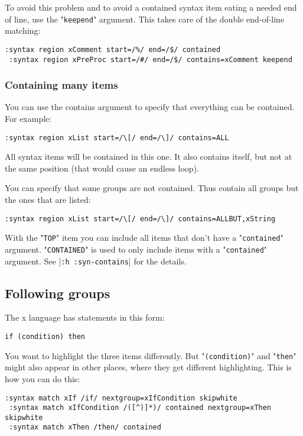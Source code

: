 To avoid this problem and to avoid a contained syntax item eating a needed end of line, use the "\verb!keepend!" argument.
This takes care of the double end-of-line matching:

\begin{Verbatim}[samepage=true]
 :syntax region xComment start=/%/ end=/$/ contained
 :syntax region xPreProc start=/#/ end=/$/ contains=xComment keepend
\end{Verbatim}

\subsubsection{Containing many items}
You can use the contains argument to specify that everything can be contained.
For example:

\begin{Verbatim}[samepage=true]
 :syntax region xList start=/\[/ end=/\]/ contains=ALL
\end{Verbatim}

All syntax items will be contained in this one.
It also contains itself, but not at the same position (that would cause an endless loop).

You can specify that some groups are not contained.
Thus contain all groups but the ones that are listed:

\begin{Verbatim}[samepage=true]
 :syntax region xList start=/\[/ end=/\]/ contains=ALLBUT,xString
\end{Verbatim}

With the "\verb!TOP!" item you can include all items that don't have a "\verb!contained!" argument.
"\verb!CONTAINED!" is used to only include items with a "\verb!contained!" argument.
See |\verb!:h :syn-contains!| for the details.
\subsection{Following groups}
The x language has statements in this form:

\begin{Verbatim}[samepage=true]
    if (condition) then 
\end{Verbatim}

You want to highlight the three items differently.
But "\verb!(condition)!" and "\verb!then!" might also appear in other places, where they get different highlighting.
This is how you can do this:

\begin{Verbatim}[samepage=true]
 :syntax match xIf /if/ nextgroup=xIfCondition skipwhite
 :syntax match xIfCondition /([^)]*)/ contained nextgroup=xThen skipwhite
 :syntax match xThen /then/ contained
\end{Verbatim}

